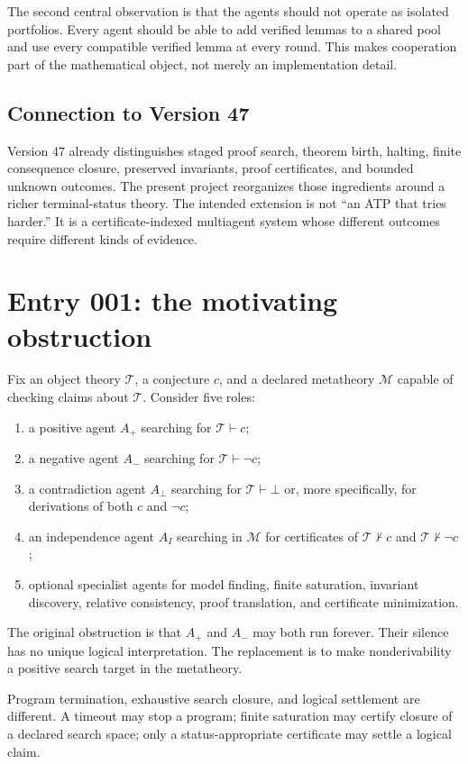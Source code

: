 \documentclass[11pt]{article}
\theoremstyle{definition}
\theoremstyle{remark}
\newcommand{\T}{\mathcal T}
\newcommand{\M}{\mathcal M}
\begin{document}
The second central observation is that the agents should not operate as isolated portfolios. Every agent should be able to add verified lemmas to a shared pool and use every compatible verified lemma at every round. This makes cooperation part of the mathematical object, not merely an implementation detail.

\subsection{Connection to Version 47}
Version 47 already distinguishes staged proof search, theorem birth, halting, finite consequence closure, preserved invariants, proof certificates, and bounded unknown outcomes. The present project reorganizes those ingredients around a richer terminal-status theory. The intended extension is not ``an ATP that tries harder.'' It is a certificate-indexed multiagent system whose different outcomes require different kinds of evidence.

\section{Entry 001: the motivating obstruction}

Fix an object theory $\T$, a conjecture $c$, and a declared metatheory $\M$ capable of checking claims about $\T$. Consider five roles:
\begin{enumerate}
  \item a positive agent $A_{+}$ searching for $\T\vdash c$;
  \item a negative agent $A_{-}$ searching for $\T\vdash\neg c$;
  \item a contradiction agent $A_{\bot}$ searching for $\T\vdash\bot$ or, more specifically, for derivations of both $c$ and $\neg c$;
  \item an independence agent $A_{I}$ searching in $\M$ for certificates of $\T\nvdash c$ and $\T\nvdash\neg c$;
  \item optional specialist agents for model finding, finite saturation, invariant discovery, relative consistency, proof translation, and certificate minimization.
\end{enumerate}

The original obstruction is that $A_{+}$ and $A_{-}$ may both run forever. Their silence has no unique logical interpretation. The replacement is to make nonderivability a positive search target in the metatheory.

\begin{decisionbox}
Program termination, exhaustive search closure, and logical settlement are different. A timeout may stop a program; finite saturation may certify closure of a declared search space; only a status-appropriate certificate may settle a logical claim.
\end{decisionbox}
\end{document}
